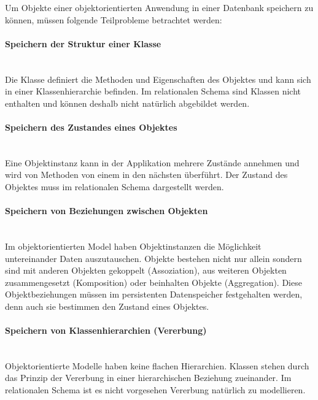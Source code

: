Um Objekte einer objektorientierten Anwendung in einer Datenbank speichern zu können, müssen folgende Teilprobleme betrachtet werden:

\paragraph{Speichern der Struktur einer Klasse} \hspace{0pt} \\
Die Klasse definiert die Methoden und Eigenschaften des Objektes und kann sich in einer Klassenhierarchie befinden. Im relationalen Schema sind Klassen nicht enthalten und können deshalb nicht natürlich abgebildet werden.

\paragraph{Speichern des Zustandes eines Objektes} \hspace{0pt} \\
Eine Objektinstanz kann in der Applikation mehrere Zustände annehmen und wird von Methoden von einem in den nächsten überführt. Der Zustand des Objektes muss im relationalen Schema dargestellt werden.

\paragraph{Speichern von Beziehungen zwischen Objekten} \hspace{0pt} \\
Im objektorientierten Model haben Objektinstanzen die Möglichkeit untereinander Daten auszutauschen. Objekte bestehen nicht nur allein sondern sind mit anderen Objekten gekoppelt (Assoziation), aus weiteren Objekten zusammengesetzt (Komposition) oder beinhalten Objekte (Aggregation). Diese Objektbeziehungen müssen im persistenten Datenspeicher festgehalten werden, denn auch sie bestimmen den Zustand eines Objektes.

\paragraph{Speichern von Klassenhierarchien (Vererbung)} \hspace{0pt} \\
Objektorientierte Modelle haben keine flachen Hierarchien. Klassen stehen durch das Prinzip der Vererbung in einer hierarchischen Beziehung zueinander. Im relationalen Schema ist es nicht vorgesehen Vererbung natürlich zu modellieren.

